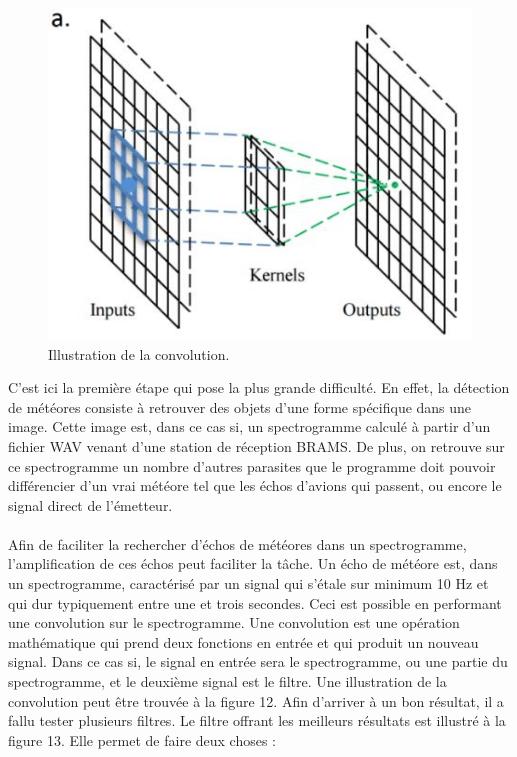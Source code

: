 \documentclass[11pt]{article}
\begin{document}
\begin{figure}[t]
    \begin{center}
        \includegraphics[scale=0.6]{a-Illustration-of-the-operation-principle-of-the-convolution-kernel-convolutional-layer.png}
        \caption{Illustration de la convolution.}
    \end{center}
\end{figure}

C'est ici la première étape qui pose la plus grande difficulté.
En effet, la détection de météores consiste à retrouver des objets d'une forme spécifique dans une image.
Cette image est, dans ce cas si, un spectrogramme calculé à partir d'un fichier WAV venant d'une station de réception BRAMS.
De plus, on retrouve sur ce spectrogramme un nombre d'autres parasites que le programme doit pouvoir différencier d'un vrai météore tel que les échos d'avions qui passent, ou encore le signal direct de l'émetteur.\\
\\
Afin de faciliter la rechercher d'échos de météores dans un spectrogramme, l'amplification de ces échos peut faciliter la tâche.
Un écho de météore est, dans un spectrogramme, caractérisé par un signal qui s'étale sur minimum 10 Hz et qui dur typiquement entre une et trois secondes.
Ceci est possible en performant une convolution sur le spectrogramme.
Une convolution est une opération mathématique qui prend deux fonctions en entrée et qui produit un nouveau signal.
Dans ce cas si, le  signal en entrée sera le spectrogramme, ou une partie du spectrogramme, et le deuxième signal est le filtre.
Une illustration de la convolution peut être trouvée à la figure 12.
Afin d'arriver à un bon résultat, il a fallu tester plusieurs filtres.
Le filtre offrant les meilleurs résultats est illustré à la figure 13.
Elle permet de faire deux choses :
\end{document}
